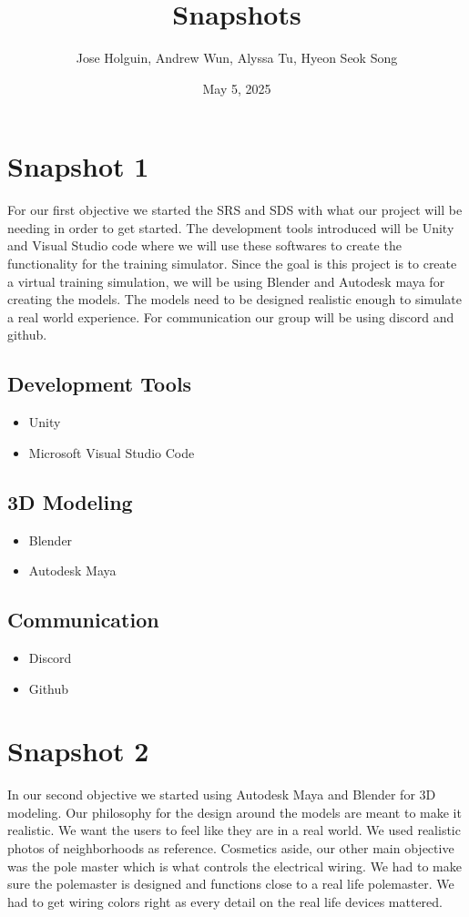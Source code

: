 \documentclass[12pt]{article}
\title{Snapshots}
\author{Jose Holguin, Andrew Wun, Alyssa Tu, Hyeon Seok Song}
\date{May 5, 2025}
\begin{document}
\maketitle

\section{Snapshot 1}
For our first objective we started the SRS and SDS with what our project will be needing in order to get started.
The development tools introduced will be Unity and Visual Studio code where we will use these softwares to create the functionality for the training simulator.
Since the goal is this project is to create a virtual training simulation, we will be using Blender and Autodesk maya for creating the models.
The models need to be designed realistic enough to simulate a real world experience.
For communication our group will be using discord and github. 
\subsection{Development Tools}
\begin{itemize}
    \item Unity 
    \item Microsoft Visual Studio Code
\end{itemize}
\subsection{3D Modeling}
\begin{itemize}
    \item Blender
    \item Autodesk Maya
\end{itemize}
\subsection{Communication}
\begin{itemize}
    \item Discord
    \item Github
\end{itemize}

\section{Snapshot 2}
In our second objective we started using Autodesk Maya and Blender for 3D modeling.
Our philosophy for the design around the models are meant to make it realistic.
We want the users to feel like they are in a real world. We used realistic photos of neighborhoods as reference.
Cosmetics aside, our other main objective was the pole master which is what controls the electrical wiring.
We had to make sure the polemaster is designed and functions close to a real life polemaster. We had to get wiring colors right as every
detail on the real life devices mattered.
\end{document}
